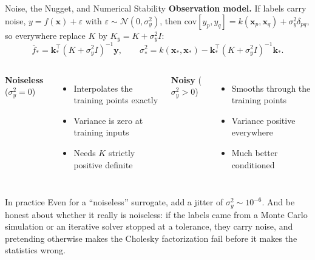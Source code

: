 \documentclass[aspectratio=169,11pt]{beamer}
\newcommand{\emphc}[1]{\textcolor{harvardcrimson}{#1}}
\newcommand{\x}{\bm{x}}
\begin{document}
\begin{frame}{Noise, the Nugget, and Numerical Stability}
\small
\textbf{Observation model.} If labels carry noise, $y = f(\x) + \varepsilon$ with $\varepsilon \sim \mathcal{N}(0,\sigma_y^2)$, then $\mathrm{cov}[y_p, y_q] = k(\x_p,\x_q) + \sigma_y^2 \delta_{pq}$, so everywhere replace $K$ by $K_y = K + \sigma_y^2 I$:
\[
\bar f_* = \bm k_*^\top (K + \sigma_y^2 I)^{-1} \bm y,
\qquad
\sigma_*^2 = k(\x_*,\x_*) - \bm k_*^\top (K + \sigma_y^2 I)^{-1} \bm k_* .
\]

\vspace{0.2cm}
\begin{columns}[T]
\textbf{Noiseless} ($\sigma_y^2 = 0$)
\begin{itemize}\itemsep1pt
  \item Interpolates the training points exactly
  \item Variance is zero at training inputs
  \item Needs $K$ strictly positive definite
\end{itemize}
\textbf{Noisy} ($\sigma_y^2 > 0$)
\begin{itemize}\itemsep1pt
  \item Smooths through the training points
  \item Variance positive everywhere
  \item Much better conditioned
\end{itemize}
\end{columns}

\vspace{0.25cm}
\begin{block}{In practice}
Even for a ``noiseless'' surrogate, add a jitter of $\sigma_y^2 \sim 10^{-6}$. \emphc{And be honest about whether it really is noiseless}: if the labels came from a Monte Carlo simulation or an iterative solver stopped at a tolerance, they carry noise, and pretending otherwise makes the Cholesky factorization fail before it makes the statistics wrong.
\end{block}
\end{frame}
\end{document}
